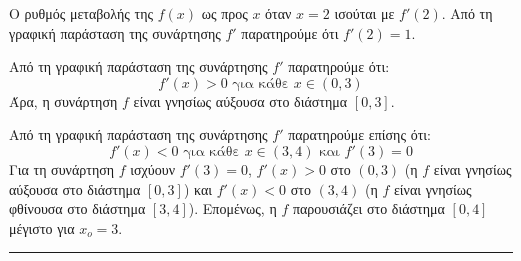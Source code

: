 \begin{alist}
    \item Ο ρυθμός μεταβολής της $f(x)$ ως προς $x$ όταν $x = 2$ ισούται με $f'(2)$. Από τη γραφική παράσταση της συνάρτησης $f'$ παρατηρούμε ότι $f'(2) = 1$.
    \item Από τη γραφική παράσταση της συνάρτησης $f'$ παρατηρούμε ότι:
    \[ f'(x) > 0 \text{ για κάθε } x \in (0,3) \]
    Άρα, η συνάρτηση $f$ είναι γνησίως αύξουσα στο διάστημα $[0,3]$.
    \item Από τη γραφική παράσταση της συνάρτησης $f'$ παρατηρούμε επίσης ότι:
    \[ f'(x) < 0 \text{ για κάθε } x \in (3,4) \text{ και } f'(3) = 0 \]
    Για τη συνάρτηση $f$ ισχύουν $f'(3) = 0$, $f'(x) > 0$ στο $(0,3)$ (η $f$ είναι γνησίως αύξουσα στο διάστημα $[0,3]$) και $f'(x) < 0$ στο $(3,4)$ (η $f$ είναι γνησίως φθίνουσα στο διάστημα $[3,4]$). Επομένως, η $f$ παρουσιάζει στο διάστημα $[0,4]$ μέγιστο για $x_o = 3$.
\end{alist}
\vspace{6mm}
\noindent\rule{\textwidth}{0.4pt}
\vspace{6mm}

